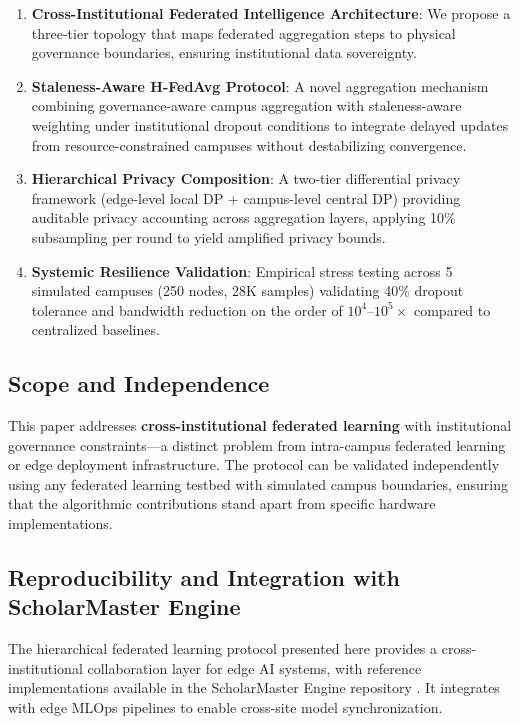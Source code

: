 \documentclass[conference]{IEEEtran}
\begin{document}
\begin{enumerate}
    \item \textbf{Cross-Institutional Federated Intelligence Architecture}: We propose a three-tier topology that maps federated aggregation steps to physical governance boundaries, ensuring institutional data sovereignty.
    \item \textbf{Staleness-Aware H-FedAvg Protocol}: A novel aggregation mechanism combining governance-aware campus aggregation with staleness-aware weighting under institutional dropout conditions to integrate delayed updates from resource-constrained campuses without destabilizing convergence.
    \item \textbf{Hierarchical Privacy Composition}: A two-tier differential privacy framework (edge-level local DP + campus-level central DP) providing auditable privacy accounting across aggregation layers, applying 10\% subsampling per round to yield amplified privacy bounds.
    \item \textbf{Systemic Resilience Validation}: Empirical stress testing across 5 simulated campuses (250 nodes, 28K samples) validating 40\% dropout tolerance and bandwidth reduction on the order of $10^4$--$10^5\times$ compared to centralized baselines.
\end{enumerate}

\subsection{Scope and Independence}
This paper addresses \textbf{cross-institutional federated learning} with institutional governance constraints---a distinct problem from intra-campus federated learning or edge deployment infrastructure. The protocol can be validated independently using any federated learning testbed with simulated campus boundaries, ensuring that the algorithmic contributions stand apart from specific hardware implementations.

\subsection{Reproducibility and Integration with ScholarMaster Engine}
The hierarchical federated learning protocol presented here provides a cross-institutional collaboration layer for edge AI systems, with reference implementations available in the ScholarMaster Engine repository \cite{scholarmaster_repo}. It integrates with edge MLOps pipelines to enable cross-site model synchronization.
\end{document}
